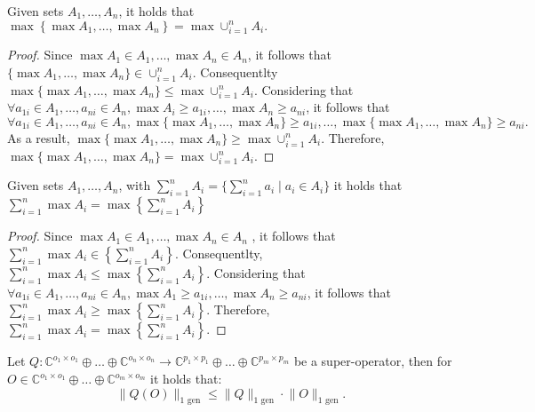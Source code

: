 \begin{lemma} \label{lemma:max_max}
  Given sets $A_1, \ldots, A_n$, it holds that $\max \left\{\max A_1, \ldots, \max A_n\right\} = \max \cup_{i=1}^{n} A_i. $
\end{lemma}
\begin{proof}
  Since $\max A_1 \in A_1, \ldots, \max A_n \in A_n$, it follows that $\{\max A_1, \ldots, \max A_n\} \in \cup_{i=1}^{n} A_i $. Consequentlty $\max \{\max A_1, \ldots, \max A_n\} \leq \max \cup_{i=1}^{n} A_i$. Considering that $ \forall a_{1i} \in A_1, \ldots, a_{ni} \in A_n, \max A_i \geq a_{1i}, \ldots, \max A_n \geq a_{ni}$,  it follows that 
  $$\forall a_{1i} \in A_1, \ldots, a_{ni} \in A_n,\max \{\max A_1, \ldots, \max A_n\} \geq a_{1i}, \ldots, \max \{\max A_1, \ldots, \max A_n\} \geq a_{ni}.$$
   As a result, $\max \{\max A_1, \ldots, \max A_n\} \geq \max \cup_{i=1}^{n} A_i$. Therefore, $\max \{\max A_1, \ldots, \max A_n\} = \max \cup_{i=1}^{n} A_i$.
\end{proof}

\begin{lemma} \label{lemma:max_sum}
Given sets $A_1, \ldots, A_n$, with $\sum_{i=1}^{n} A_i = \{\sum_{i=1}^{n} a_{i} \mid a_i \in A_i\}$  it holds that $\sum_{i=1}^{n} \max A_i = \max \left\{\sum_{i=1}^{n} A_i\right\}$
\end{lemma}
\begin{proof}
  Since  $\max A_1 \in A_1, \ldots, \max A_n \in A_n$ , it follows  that $\sum_{i=1}^{n} \max A_i \in \left\{\sum_{i=1}^{n} A_i\right\}$. Consequentlty, $\sum_{i=1}^{n} \max A_i \leq \max \left\{\sum_{i=1}^{n} A_i\right\}$. Considering that $ \forall a_{1i} \in A_1, \ldots, a_{ni} \in A_n, \max A_1 \geq a_{1i}, \ldots,  \max A_n \geq a_{ni} $, it follows that $ \sum_{i=1}^{n} \max A_i \geq \max \left\{\sum_{i=1}^{n} A_i\right\} $. Therefore, $\sum_{i=1}^{n} \max A_i = \max \left\{\sum_{i=1}^{n} A_i\right\}$.
\end{proof}


\begin{lemma}\label{lem:q(o)}
  Let  $Q: \mathbb{C}^{o_1 \times o_1} \oplus \ldots \oplus \mathbb{C}^{o_n \times o_n}  \rightarrow \mathbb{C}^{p_1 \times p_1} \oplus \ldots \oplus  \mathbb{C}^{p_m \times p_m}$ be a super-operator, then for $O \in \mathbb{C}^{o_1 \times o_1} \oplus \ldots \oplus  \mathbb{C}^{o_m \times o_m}$ it holds that:
  \begin{equation} \label{eq:qo<q}
    \lVert Q(O) \rVert_{1 \text{ gen}} \leq \lVert Q  \rVert_{1 \text{ gen}} \cdot \lVert O  \rVert_{1 \text{ gen}}.
  \end{equation}
\end{lemma}

